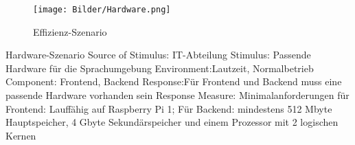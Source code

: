 \documentclass[12pt]{article}
\begin{document}
\begin{figure}[tbh]
  \centering
  \texttt{[image: Bilder/Hardware.png]}
  \caption{Effizienz-Szenario}
  \label{fig:Qualitaet6}
\end{figure}


Hardware-Szenario
Source of Stimulus: IT-Abteilung
Stimulus: Passende Hardware für die Sprachumgebung
Environment:Lautzeit, Normalbetrieb
Component: Frontend, Backend
Response:Für Frontend und Backend muss eine passende Hardware vorhanden sein
Response Measure: Minimalanforderungen für Frontend: Lauffähig auf Raspberry Pi 1; Für Backend: mindestens 512 Mbyte Hauptspeicher, 4 Gbyte Sekundärspeicher und einem Prozessor mit 2 logischen Kernen
\end{document}
